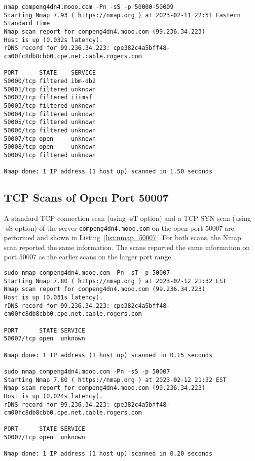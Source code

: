 \begin{lstlisting}[caption=Nmap TCP SYN Scan Over Port Range 50000-50009,label=list:nmap_mooo_sS]
nmap compeng4dn4.mooo.com -Pn -sS -p 50000-50009
Starting Nmap 7.93 ( https://nmap.org ) at 2023-02-11 22:51 Eastern Standard Time
Nmap scan report for compeng4dn4.mooo.com (99.236.34.223)
Host is up (0.032s latency).
rDNS record for 99.236.34.223: cpe382c4a5bff48-cm00fc8db8cbb0.cpe.net.cable.rogers.com

PORT      STATE    SERVICE
50000/tcp filtered ibm-db2
50001/tcp filtered unknown
50002/tcp filtered iiimsf
50003/tcp filtered unknown
50004/tcp filtered unknown
50005/tcp filtered unknown
50006/tcp filtered unknown
50007/tcp open     unknown
50008/tcp open     unknown
50009/tcp filtered unknown

Nmap done: 1 IP address (1 host up) scanned in 1.50 seconds
\end{lstlisting}

\subsection*{TCP Scans of Open Port 50007}
A standard TCP connection scan (using -sT option) and a TCP SYN scan (using -sS option) of the server \texttt{compeng4dn4.mooo.com} on the open port 50007 are performed and shown in Listing~\ref{list:nmap_50007}. For both scans, the Nmap scan reported the same information. The scans reported the same information on port 50007 as the earlier scans on the larger port range.

\begin{lstlisting}[caption=Nmap Scans on Port 50007,label=list:nmap_50007]
sudo nmap compeng4dn4.mooo.com -Pn -sT -p 50007
Starting Nmap 7.80 ( https://nmap.org ) at 2023-02-12 21:32 EST
Nmap scan report for compeng4dn4.mooo.com (99.236.34.223)
Host is up (0.031s latency).
rDNS record for 99.236.34.223: cpe382c4a5bff48-cm00fc8db8cbb0.cpe.net.cable.rogers.com

PORT      STATE SERVICE
50007/tcp open  unknown

Nmap done: 1 IP address (1 host up) scanned in 0.15 seconds

sudo nmap compeng4dn4.mooo.com -Pn -sS -p 50007
Starting Nmap 7.80 ( https://nmap.org ) at 2023-02-12 21:32 EST
Nmap scan report for compeng4dn4.mooo.com (99.236.34.223)
Host is up (0.024s latency).
rDNS record for 99.236.34.223: cpe382c4a5bff48-cm00fc8db8cbb0.cpe.net.cable.rogers.com

PORT      STATE SERVICE
50007/tcp open  unknown

Nmap done: 1 IP address (1 host up) scanned in 0.20 seconds
\end{lstlisting}

